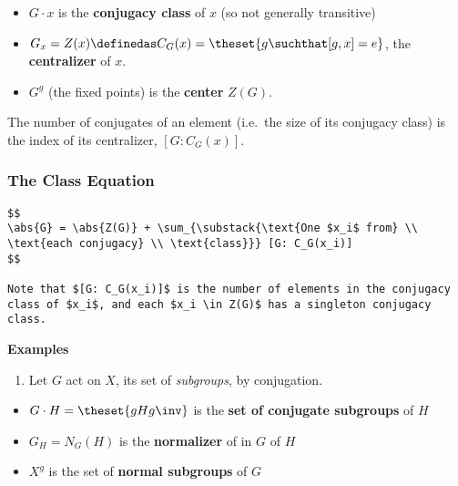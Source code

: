 \begin{itemize}
\item
  \(G \cdot x\) is the \textbf{conjugacy class} of \(x\) (so not
  generally transitive)
\item
  \(G_x = Z(x) \definedas C_G(x) = \theset{g \suchthat [g, x] = e}\),
  the \textbf{centralizer} of \(x\).
\item
  \(G^g\) (the fixed points) is the \textbf{center} \(Z(G)\).
\end{itemize}

\begin{corollary}

The number of conjugates of an element (i.e.~the size of its conjugacy
class) is the index of its centralizer, \([G: C_G(x)]\).

\end{corollary}

\hypertarget{the-class-equation}{%
\subsubsection{The Class Equation}\label{the-class-equation}}

\begin{verbatim}
$$
\abs{G} = \abs{Z(G)} + \sum_{\substack{\text{One $x_i$ from} \\ \text{each conjugacy} \\ \text{class}}} [G: C_G(x_i)]
$$

Note that $[G: C_G(x_i)]$ is the number of elements in the conjugacy class of $x_i$, and each $x_i \in Z(G)$ has a singleton conjugacy class.
\end{verbatim}

\textbf{Examples}

\begin{enumerate}
\def\labelenumi{\arabic{enumi}.}
\tightlist
\item
  Let \(G\) act on \(X\), its set of \emph{subgroups}, by conjugation.
\end{enumerate}

\begin{itemize}
\item
  \(G\cdot H = \theset{gHg\inv}\) is the \textbf{set of conjugate
  subgroups} of \(H\)
\item
  \(G_H = N_G(H)\) is the \textbf{normalizer} of in \(G\) of \(H\)
\item
  \(X^g\) is the set of \textbf{normal subgroups} of \(G\)
\end{itemize}


